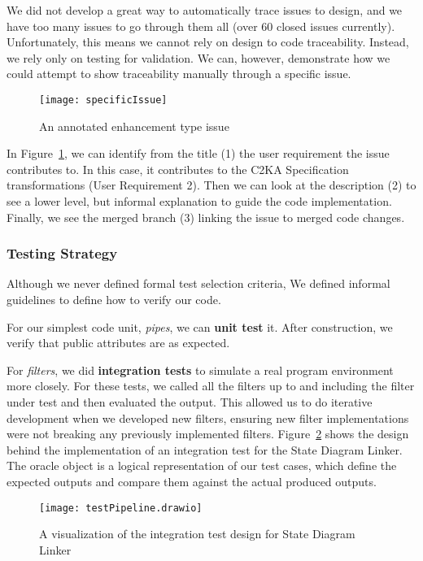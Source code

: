 We did not develop a great way to automatically trace issues to design,
and we have too many issues to go through them all (over 60 closed issues currently).
Unfortunately, this means we cannot rely on design to code traceability.
Instead, we rely only on testing for validation.
We can, however, demonstrate how we could attempt to show traceability manually through a specific issue.
\begin{figure}[ht]
    \centering
    \texttt{[image: specificIssue]}
    \caption{An annotated enhancement type issue}
    \label{fig:specificIssue}
\end{figure}
In Figure~\ref{fig:specificIssue}, we can identify from the title (1) the user requirement the issue contributes to.
In this case, it contributes to the C2KA Specification transformations (User Requirement 2).
Then we can look at the description (2) to see a lower level, but informal explanation to guide the code implementation.
Finally, we see the merged branch (3) linking the issue to merged code changes.

\subsubsection{Testing Strategy}\label{subsubsec:tests-strat}
Although we never defined formal test selection criteria,
We defined informal guidelines to define how to verify our code.

For our simplest code unit, \textit{pipes}, we can \textbf{unit test} it.
After construction, we verify that public attributes are as expected.

For \textit{filters}, we did \textbf{integration tests} to simulate a real program environment more closely.
For these tests, we called all the filters up to and including the filter under test and then evaluated the output.
This allowed us to do iterative development when we developed new filters,
ensuring new filter implementations were not breaking any previously implemented filters.
Figure~\ref{fig:testShowcase} shows the design behind the implementation of an integration test for the State Diagram Linker.
The oracle object is a logical representation of our test cases, which define the expected outputs and compare them against the actual produced outputs.
\begin{figure}[ht]
    \centering
    \texttt{[image: testPipeline.drawio]}
    \caption{A visualization of the integration test design for State Diagram Linker}
    \label{fig:testShowcase}
\end{figure}

